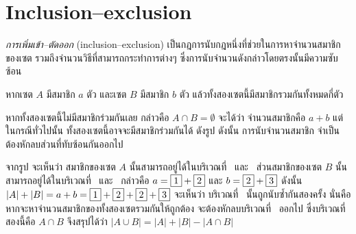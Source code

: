 \section{Inclusion--exclusion}
\emph{การเพิ่มเข้า--ตัดออก} (inclusion--exclusion) เป็นกฎการนับกฎหนึ่งที่ช่วยในการหาจำนวนสมาชิกของเซต รวมถึงจำนวนวิธีที่สามารถกระทำการต่างๆ ซึ่งการนับจำนวนดังกล่าวโดยตรงนั้นมีความซับซ้อน

\newcommand\cnode[1]{\fbox{#1}}

\begin{example}
หากเซต $A$ มีสมาชิก $a$ ตัว และเซต $B$ มีสมาชิก $b$ ตัว แล้วทั้งสองเซตนี้มีสมาชิกรวมกันทั้งหมดกี่ตัว

หากทั้งสองเซตนี้ไม่มีสมาชิกร่วมกันเลย กล่าวคือ $A\cap B=\emptyset$ จะได้ว่า จำนวนสมาชิกคือ $a+b$ \enskip แต่ในกรณีทั่วไปนั้น ทั้งสองเซตนี้อาจจะมีสมาชิกร่วมกันได้ ดังรูป \enskip ดังนั้น การนับจำนวนสมาชิก จำเป็นต้องหักลบส่วนที่ทับซ้อนกันออกไป
\begin{center}
\end{center}

จากรูป จะเห็นว่า สมาชิกของเซต $A$ นั้นสามารถอยู่ได้ในบริเวณที่~\cnode{1} และ~\cnode{2} ส่วนสมาชิกของเซต $B$ นั้นสามารถอยู่ได้ในบริเวณที่~\cnode{2} และ~\cnode{3} กล่าวคือ $a=\cnode{1}+\cnode{2}$ และ $b=\cnode{2}+\cnode{3}$ \enskip ดังนั้น $|A|+|B|=a+b=\cnode{1}+\cnode{2}+\cnode{2}+\cnode{3}$ \enskip จะเห็นว่า บริเวณที่~\cnode{2} นั้นถูกนับซ้ำกันสองครั้ง นั่นคือ หากจะหาจำนวนสมาชิกของทั้งสองเซตรวมกันให้ถูกต้อง จะต้องหักลบบริเวณที่~\cnode{2} ออกไป ซึ่งบริเวณที่สองนี้คือ $A\cap B$ \enskip จึงสรุปได้ว่า $|A\cup B|=|A|+|B|-|A\cap B|$
\end{example}

